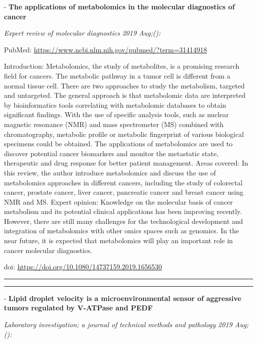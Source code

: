 \documentclass[]{article}
\begin{document}
 - \textbf{The applications of metabolomics in the molecular diagnostics
of cancer}

\emph{Expert review of molecular diagnostics 2019 Aug;():}

PubMed: \url{https://www.ncbi.nlm.nih.gov/pubmed/?term=31414918}

Introduction: Metabolomics, the study of metabolites, is a promising
research field for cancers. The metabolic pathway in a tumor cell is
different from a normal tissue cell. There are two approaches to study
the metabolism, targeted and untargeted. The general approach is that
metabolomic data are interpreted by bioinformatics tools correlating
with metabolomic databases to obtain significant findings. With the use
of specific analysis tools, such as nuclear magnetic resonance (NMR) and
mass spectrometer (MS) combined with chromatography, metabolic profile
or metabolic fingerprint of various biological specimens could be
obtained. The applications of metabolomics are used to discover
potential cancer biomarkers and monitor the metastatic state,
therapeutic and drug response for better patient management. Areas
covered: In this review, the author introduce metabolomics and discuss
the use of metabolomics approaches in different cancers, including the
study of colorectal cancer, prostate cancer, liver cancer, pancreatic
cancer and breast cancer using NMR and MS. Expert opinion: Knowledge on
the molecular basis of cancer metabolism and its potential clinical
applications has been improving recently. However, there are still many
challenges for the technological development and integration of
metabolomics with other omics spaces such as genomics. In the near
future, it is expected that metabolomics will play an important role in
cancer molecular diagnostics.

doi: \url{https://doi.org/10.1080/14737159.2019.1656530}

{}

{}

\begin{center}\rule{0.5\linewidth}{\linethickness}\end{center}

\begin{center}\rule{0.5\linewidth}{\linethickness}\end{center}

 - \textbf{Lipid droplet velocity is a microenvironmental sensor of
aggressive tumors regulated by V-ATPase and PEDF}

\emph{Laboratory investigation; a journal of technical methods and
pathology 2019 Aug;():}
\end{document}
